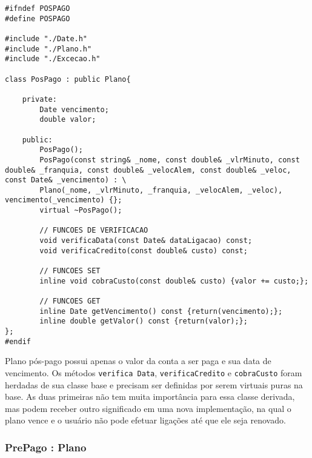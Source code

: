 \begin{lstlisting}[basicstyle=\tiny]
#ifndef POSPAGO
#define POSPAGO

#include "./Date.h"
#include "./Plano.h"
#include "./Excecao.h"

class PosPago : public Plano{

	private:
		Date vencimento;
		double valor;

	public:
		PosPago();
		PosPago(const string& _nome, const double& _vlrMinuto, const double& _franquia, const double& _velocAlem, const double& _veloc, const Date& _vencimento) : \
		Plano(_nome, _vlrMinuto, _franquia, _velocAlem, _veloc), vencimento(_vencimento) {};
		virtual ~PosPago();
		
		// FUNCOES DE VERIFICACAO
		void verificaData(const Date& dataLigacao) const;
		void verificaCredito(const double& custo) const;
		
		// FUNCOES SET
		inline void cobraCusto(const double& custo) {valor += custo;};
		
		// FUNCOES GET
		inline Date getVencimento() const {return(vencimento);};
		inline double getValor() const {return(valor);};
};
#endif
\end{lstlisting}

Plano pós-pago possui apenas o valor da conta a ser paga e sua data de vencimento. Os métodos \texttt{verifica Data},  \texttt{verificaCredito} e \texttt{cobraCusto} foram herdadas de sua classe base e precisam ser definidas por serem virtuais puras na base. As duas primeiras não tem muita importância para essa classe derivada, mas podem receber outro significado em uma nova implementação, na qual o plano vence e o usuário não pode efetuar ligações até que ele seja renovado.

\subsubsection{PrePago : Plano} \label{sec:prepago}

